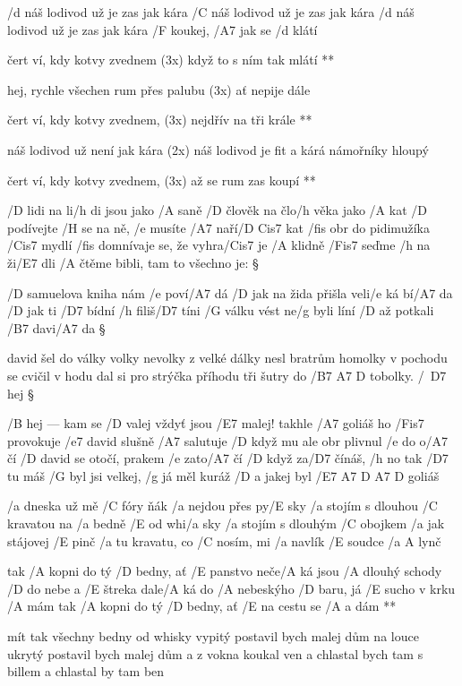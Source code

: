 /d náš lodivod už je zas jak kára
/C náš lodivod už je zas jak kára
/d náš lodivod už je zas jak kára
/F koukej, /A7 jak se /d klátí

\R čert ví, kdy kotvy zvednem (3x)
   když to s ním tak mlátí **

hej, rychle všechen rum přes palubu (3x)
ať nepije dále

\R čert ví, kdy kotvy zvednem, (3x)
   nejdřív na tři krále **

náš lodivod už není jak kára (2x)
náš lodivod je fit a kárá
námořníky hloupý

\R čert ví, kdy kotvy zvednem, (3x)
   až se rum zas koupí **




/D lidi na li/h di jsou jako /A saně
/D člověk na člo/h věka jako /A kat
/D podívejte /H se na ně, /e musíte /A7 naří/{D Cis7} kat
/fis obr do pidimužíka /Cis7 mydlí
/fis domnívaje se, že vyhra/Cis7 je
/A klidně /Fis7 seďme /h na ži/E7 dli
/A čtěme bibli, tam to všechno je: \S

/D samuelova kniha nám /e poví/A7 dá
/D jak na žida přišla veli/e ká bí/A7 da
/D jak ti /D7 bídní /h filiš/D7 tíni %
/G válku vést ne/g byli líní
/D až potkali /B7 davi/A7 da \S

david šel do války volky nevolky
z velké dálky nesl bratrům homolky
v pochodu se cvičil v hodu %
dal si pro strýčka příhodu
tři šutry do /{B7 A7 D} tobolky. /\ D7 hej \S

/B hej --- kam se /D valej vždyť jsou /E7 malej!
takhle /A7 goliáš ho /Fis7 provokuje
/e7 david slušně /A7 salutuje
/D když mu ale obr plivnul /e do o/A7 čí
/D david se otočí, prakem /e zato/A7 čí
/D když za/D7 čínáš, /h no tak /D7 tu máš
/G byl jsi velkej, /g já měl kuráž %
/D a jakej byl /{E7 A7 D A7 D} goliáš




/a dneska už mě /C fóry ňák /a nejdou přes py/E sky
/a stojím s dlouhou /C kravatou na /a bedně /E od whi/a sky
/a stojím s dlouhým /C obojkem /a jak stájovej /E pinč
/a tu kravatu, co /C nosím, mi /a navlík /E soudce /{a A} lynč

\R tak /A kopni do tý /D bedny, ať /E panstvo neče/A ká
   jsou /A dlouhý schody /D do nebe a /E štreka dale/A ká
   do /A nebeskýho /D baru, já /E sucho v krku /A mám
   tak /A kopni do tý /D bedny, ať /E na cestu se /{A a} dám **

mít tak všechny bedny od whisky vypitý
postavil bych malej dům na louce ukrytý
postavil bych malej dům a z vokna koukal ven
a chlastal bych tam s billem a chlastal by tam ben \s


